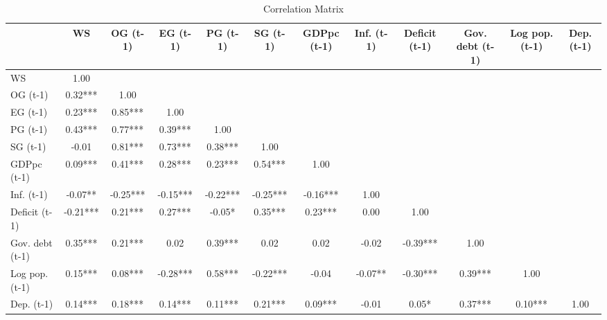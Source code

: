 \begin{table}[htbp]
\caption{Correlation Matrix}
\label{tab:correlation_matrix}
\begin{tabular}{lccccccccccc}
\toprule
 & WS & OG (t-1) & EG (t-1) & PG (t-1) & SG (t-1) & GDPpc (t-1) & Inf. (t-1) & Deficit (t-1) & Gov. debt (t-1) & Log pop. (t-1) & Dep. (t-1) \\
\midrule
WS & 1.00 &  &  &  &  &  &  &  &  &  &  \\
OG (t-1) & 0.32*** & 1.00 &  &  &  &  &  &  &  &  &  \\
EG (t-1) & 0.23*** & 0.85*** & 1.00 &  &  &  &  &  &  &  &  \\
PG (t-1) & 0.43*** & 0.77*** & 0.39*** & 1.00 &  &  &  &  &  &  &  \\
SG (t-1) & -0.01 & 0.81*** & 0.73*** & 0.38*** & 1.00 &  &  &  &  &  &  \\
GDPpc (t-1) & 0.09*** & 0.41*** & 0.28*** & 0.23*** & 0.54*** & 1.00 &  &  &  &  &  \\
Inf. (t-1) & -0.07** & -0.25*** & -0.15*** & -0.22*** & -0.25*** & -0.16*** & 1.00 &  &  &  &  \\
Deficit (t-1) & -0.21*** & 0.21*** & 0.27*** & -0.05* & 0.35*** & 0.23*** & 0.00 & 1.00 &  &  &  \\
Gov. debt (t-1) & 0.35*** & 0.21*** & 0.02 & 0.39*** & 0.02 & 0.02 & -0.02 & -0.39*** & 1.00 &  &  \\
Log pop. (t-1) & 0.15*** & 0.08*** & -0.28*** & 0.58*** & -0.22*** & -0.04 & -0.07** & -0.30*** & 0.39*** & 1.00 &  \\
Dep. (t-1) & 0.14*** & 0.18*** & 0.14*** & 0.11*** & 0.21*** & 0.09*** & -0.01 & 0.05* & 0.37*** & 0.10*** & 1.00 \\
\bottomrule
\end{tabular}
\end{table}
